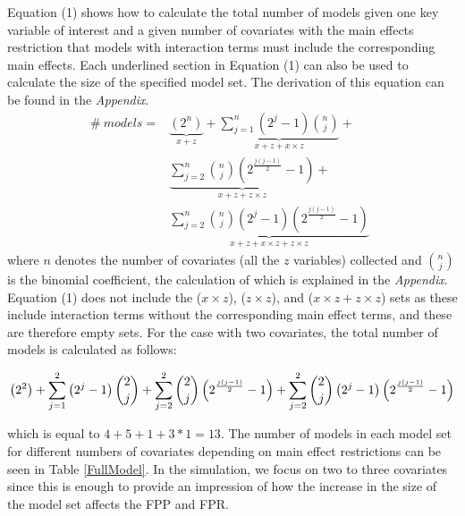 

Equation (1) shows how to calculate the total number of models given one key variable of interest and a given number of covariates with the main effects restriction that models with interaction terms must include the corresponding main effects. Each underlined section in Equation (1) can also be used to calculate the size of the specified model set. The derivation of this equation can be found in the \textit{Appendix}. \\

\begin{equation} 
\begin{aligned}
\#\ models={} & \underbrace{\left(2^n\right)}_{x + z}+\underbrace{\sum^n_{j=1}{\left(2^j-1\right)\binom{n}{j}}}_{x + z + x \times z} + \\ 
& \underbrace{\sum^n_{j=2}{\binom{n}{j}\left(2^{\frac{j\left(j-1\right)}{2}}-1\right)}}_{x + z + z \times z} + \\
& \underbrace{\sum^n_{j=2}{\binom{n}{j}\left(2^j-1\right)\left(2^{\frac{j\left(j-1\right)}{2}}-1\right)}}_{x + z + x \times z + z \times z}\ \  
\end{aligned}
\end{equation} 
where $n$ denotes the number of covariates (all the $z$ variables) collected and $\binom{n}{j}$ is the binomial coefficient, the calculation of which is explained in the \textit{Appendix}.
Equation (1) does not include the ($x \times z$), ($z \times z$), and ($x \times z + z \times z$) sets as these include interaction terms without the corresponding main effect terms, and these are therefore empty sets. For the case with two covariates, the total number of models is calculated as follows:

\begin{equation*}
\centering
\left(2^2\right)+
\sum^2_{j=1}{\left(2^j-1\right) \binom{2}{j}}+
\sum^2_{j=2}{\binom{2}{j}\left(2^{\frac{j\left(j-1\right)}{2}}-1\right)}+  
\sum^2_{j=2}{\binom{2}{j}\left(2^j-1\right)\left(2^{\frac{j\left(j-1\right)}{2}}-1\right)}
\end{equation*}

which is equal to $4+5+1+3*1=13$. The number of models in each model set for different numbers of covariates depending on main effect restrictions can be seen in Table \ref{FullModel}. In the simulation, we focus on two to three covariates since this is enough to provide an impression of how the increase in the size of the model set affects the FPP and FPR.  \\


